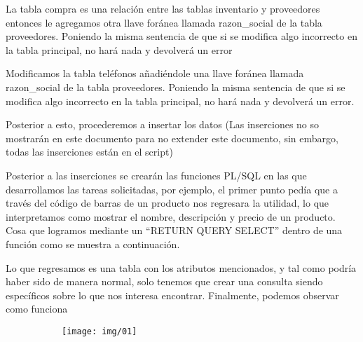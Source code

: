 \documentclass[letterpaper,12pt]{article}
\begin{document}
	
	
	La tabla compra es una relación entre las tablas inventario y proveedores entonces le agregamos otra llave foránea llamada razon\_social de la tabla proveedores.
	Poniendo la misma sentencia de que si se modifica algo incorrecto en la tabla principal, no hará nada y devolverá un error
	
	
	
	
	Modificamos la tabla teléfonos añadiéndole una llave foránea llamada razon\_social de la tabla proveedores.
	Poniendo la misma sentencia de que si se modifica algo incorrecto en la tabla principal, no hará nada y devolverá un error.
	
	
	
	Posterior a esto, procederemos a insertar los datos (Las inserciones no so mostrarán en este documento para no extender este documento, sin embargo, todas las inserciones están en el script)
	
	Posterior a las inserciones se crearán las funciones PL/SQL en las que desarrollamos las tareas solicitadas, por ejemplo, el primer punto pedía que a través del código de barras de un producto nos regresara la utilidad, lo que interpretamos como mostrar el nombre, descripción y precio de un producto. Cosa que logramos mediante un “RETURN QUERY SELECT” dentro de una función como se muestra a continuación.
	
	 
	
	Lo que regresamos es una tabla con los atributos mencionados, y tal como podría haber sido de manera normal, solo tenemos que crear una consulta siendo específicos sobre lo que nos interesa encontrar. 
	Finalmente, podemos observar como funciona 
	
	
	\begin{figure}[H]

		\begin{subfigure}{20cm}

			\centering

			\texttt{[image: img/01]}

		\end{subfigure}

	\end{figure}
\end{document}
